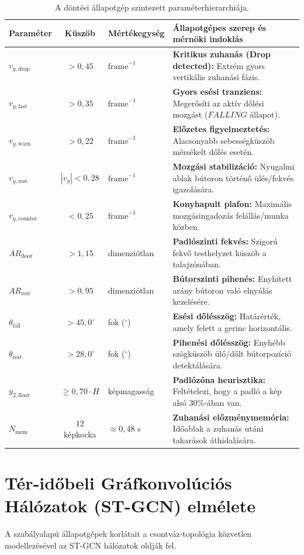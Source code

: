 \documentclass[12pt,a4paper,oneside]{report}
\begin{document}
\begin{table}[H]
\centering
\small
\begin{tabularx}{\textwidth}{p{2.2cm}cp{2.2cm}X}
\toprule
\textbf{Paraméter} & \textbf{Küszöb} & \textbf{Mértékegység} & \textbf{Állapotgépes szerep és mérnöki indoklás} \\
\midrule
$v_{y,\text{drop}}$ & $> 0{,}45$ & $\text{frame}^{-1}$ & \textbf{Kritikus zuhanás (Drop detected):} Extrém gyors vertikális zuhanási fázis. \\
$v_{y,\text{fast}}$ & $> 0{,}35$ & $\text{frame}^{-1}$ & \textbf{Gyors esési tranziens:} Megerősíti az aktív dőlési mozgást ($FALLING$ állapot). \\
$v_{y,\text{warn}}$ & $> 0{,}22$ & $\text{frame}^{-1}$ & \textbf{Előzetes figyelmeztetés:} Alacsonyabb sebességküszöb mérsékelt dőlés esetén. \\
$v_{y,\text{rest}}$ & $|v_y| < 0{,}28$ & $\text{frame}^{-1}$ & \textbf{Mozgási stabilizáció:} Nyugalmi ablak bútoron történő ülés/fekvés igazolására. \\
$v_{y,\text{counter}}$ & $< 0{,}25$ & $\text{frame}^{-1}$ & \textbf{Konyhapult plafon:} Maximális mozgásingadozás felállás/munka közben. \\
$AR_{\text{floor}}$ & $> 1{,}15$ & dimenziótlan & \textbf{Padlószinti fekvés:} Szigorú fekvő testhelyzet küszöb a talajzónában. \\
$AR_{\text{rest}}$ & $> 0{,}95$ & dimenziótlan & \textbf{Bútorszinti pihenés:} Enyhített arány bútoron való elnyúlás kezelésére. \\
$\theta_{\text{fall}}$ & $> 45{,}0^\circ$ & fok ($^\circ$) & \textbf{Esési dőlésszög:} Határérték, amely felett a gerinc horizontális. \\
$\theta_{\text{rest}}$ & $> 28{,}0^\circ$ & fok ($^\circ$) & \textbf{Pihenési dőlésszög:} Enyhébb szögküszöb ülő/dőlt bútorpozíció detektálására. \\
$y_{2,\text{floor}}$ & $\ge 0{,}70 \cdot H$ & képmagasság & \textbf{Padlózóna heurisztika:} Feltételezi, hogy a padló a kép alsó 30\%-ában van. \\
$N_{\text{mem}}$ & $12$ képkocka & $\approx 0{,}48$ s & \textbf{Zuhanási előzménymemória:} Időablak a zuhanás utáni takarások áthidalására. \\
\bottomrule
\end{tabularx}
\caption{A döntési állapotgép szintezett paraméterhierarchiája.}
\label{tab:param_hierarchy}
\end{table}

\section{Tér-időbeli Gráfkonvolúciós Hálózatok (ST-GCN) elmélete}
A szabályalapú állapotgépek korlátait a csontváz-topológia közvetlen modellezésével az ST-GCN \cite{yan2018stgcn} hálózatok oldják fel.
\end{document}
